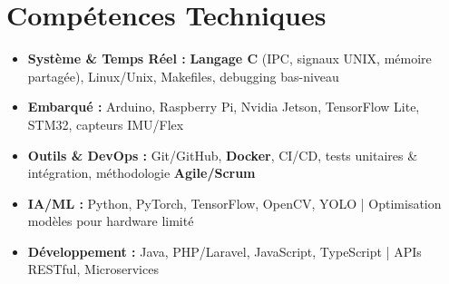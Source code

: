 \documentclass[a4paper,11pt]{article}
\begin{document}
\section{Compétences Techniques}
\begin{itemize}[leftmargin=*, nosep]
    \item \small{\textbf{Système \& Temps Réel :} \textbf{Langage C} (IPC, signaux UNIX, mémoire partagée), Linux/Unix, Makefiles, debugging bas-niveau}
    \item \small{\textbf{Embarqué :} Arduino, Raspberry Pi, Nvidia Jetson, TensorFlow Lite, STM32, capteurs IMU/Flex}
    \item \small{\textbf{Outils \& DevOps :} Git/GitHub, \textbf{Docker}, CI/CD, tests unitaires \& intégration, méthodologie \textbf{Agile/Scrum}}
    \item \small{\textbf{IA/ML :} Python, PyTorch, TensorFlow, OpenCV, YOLO | Optimisation modèles pour hardware limité}
    \item \small{\textbf{Développement :} Java, PHP/Laravel, JavaScript, TypeScript | APIs RESTful, Microservices}
\end{itemize}

\end{document}
